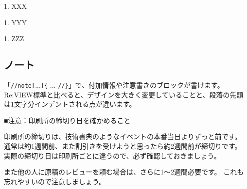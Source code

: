\begin{starterprogram}\end{starterprogram}
\noindent
{}

\starterresult

\begin{starterenumerate}
\item[1.] XXX
\item[1.] YYY
\item[1.] ZZZ
\end{starterenumerate}

\endstarterresult

\subsection*{ノート}
\label{sec:1-1-4}
\label{subsec-ext-note}

「\texttt{//note[}...\texttt{]\{} ... \texttt{//\}}」で、付加情報や注意書きのブロックが書けます。
Re:VIEW標準と比べると、デザインを大きく変更していることと、段落の先頭は1文字分インデントされる点が違います。

\begin{starterprogram}\end{starterprogram}
\noindent
{}

\starterresult
\begin{starternote}{■注意：印刷所の締切り日を確かめること}
\begin{starternoteinner}

印刷所の締切りは、技術書典のようなイベントの本番当日よりずっと前です。
通常は約1週間前、また割引きを受けようと思ったら約2週間前が締切りです。
実際の締切り日は印刷所ごとに違うので、必ず確認しておきましょう。

また他の人に原稿のレビューを頼む場合は、さらに1〜2週間必要です。
これも忘れやすいので注意しましょう。

\end{starternoteinner}
\end{starternote}
\endstarterresult

